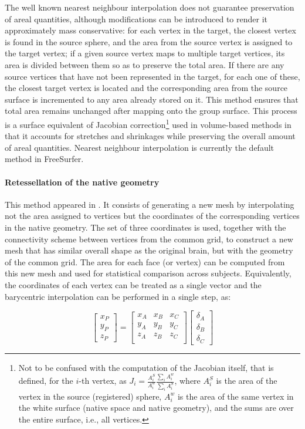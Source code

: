 The well known nearest neighbour interpolation does not guarantee preservation of areal quantities, although modifications can be introduced to render it approximately mass conservative: for each vertex in the target, the closest vertex is found in the source sphere, and the area from the source vertex is assigned to the target vertex; if a given source vertex maps to multiple target vertices, its area is divided between them so as to preserve the total area. If there are any source vertices that have not been represented in the target, for each one of these, the closest target vertex is located and the corresponding area from the source surface is incremented to any area already stored on it. This method ensures that total area remains unchanged after mapping onto the group surface.  This process is a surface equivalent of Jacobian correction\footnote{Not to be confused with the computation of the Jacobian itself, that is defined, for the $i$-th vertex, as $J_i = \frac{A^S_i}{A^w_i}\frac{\sum_i A^w_i}{\sum_i A^S_i}$, where $A^S_i$ is the area of the vertex in the source (registered) sphere, $A^w_i$ is the area of the same vertex in the white surface (native space and native geometry), and the sums are over the entire surface, i.e., all vertices.} used in volume-based methods in that it accounts for stretches and shrinkages while preserving the overall amount of areal quantities. Nearest neighbour interpolation is currently the default method in FreeSurfer.

\paragraph{Retessellation of the native geometry}

This method appeared in \citet{Saad2004}. It consists of generating a new mesh by interpolating not the area assigned to vertices but the coordinates of the corresponding vertices in the native geometry. The set of three coordinates is used, together with the connectivity scheme between vertices from the common grid, to construct a new mesh that has similar overall shape as the original brain, but with the geometry of the common grid. The area for each face (or vertex) can be computed from this new mesh and used for statistical comparison across subjects. Equivalently, the coordinates of each vertex can be treated as a single vector and the barycentric interpolation can be performed in a single step, as:

$$
\left[
\begin{array}{c}
x_{P} \\
y_{P} \\
z_{P}
\end{array} \right] = \left[
\begin{array}{ccc}
x_{A} & x_{B} & x_{C} \\
y_{A} & y_{B} & y_{C} \\
z_{A} & z_{B} & z_{C} \\
\end{array}
\right] \left[
\begin{array}{c}
\delta_{A} \\
\delta_{B} \\
\delta_{C}
\end{array} \right]
$$

